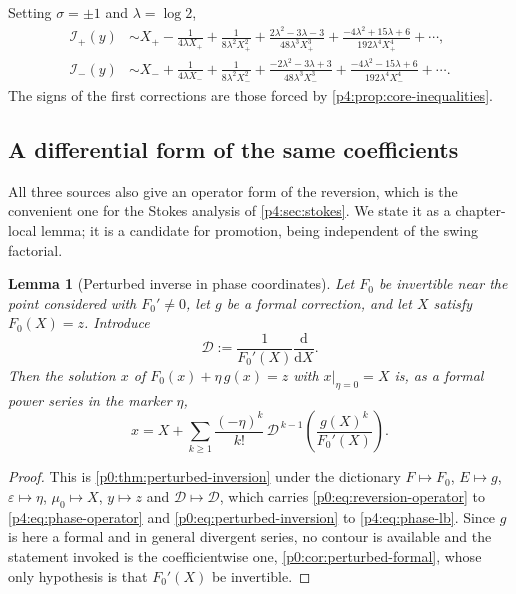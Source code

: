 \documentclass[11pt,a4paper,oneside]{book}
\theoremstyle{plain}
\newtheorem{lemma}[theorem]{Lemma}
\theoremstyle{definition}
\theoremstyle{remark}
\newcommand{\dd}{\mathrm{d}}
\newcommand{\Xcore}{X}
\begin{document}
Setting $\sigma=\pm1$ and $\lambda=\log2$,
\begin{align}
  \mathcal I_+(y)&\sim \Xcore_+
   -\frac1{4\lambda \Xcore_+}+\frac1{8\lambda^{2}\Xcore_+^{2}}
   +\frac{2\lambda^{2}-3\lambda-3}{48\lambda^{3}\Xcore_+^{3}}
   +\frac{-4\lambda^{2}+15\lambda+6}{192\lambda^{4}\Xcore_+^{4}}+\cdots,
  \label{p4:eq:odd-inverse}\\
  \mathcal I_-(y)&\sim \Xcore_-
   +\frac1{4\lambda \Xcore_-}+\frac1{8\lambda^{2}\Xcore_-^{2}}
   +\frac{-2\lambda^{2}-3\lambda+3}{48\lambda^{3}\Xcore_-^{3}}
   +\frac{-4\lambda^{2}-15\lambda+6}{192\lambda^{4}\Xcore_-^{4}}+\cdots.
  \label{p4:eq:even-inverse}
\end{align}
The signs of the first corrections are those forced by
\cref{p4:prop:core-inequalities}.

\subsection{A differential form of the same coefficients}

All three sources also give an operator form of the reversion, which is the
convenient one for the Stokes analysis of \cref{p4:sec:stokes}.  We state it
as a chapter-local lemma; it is a candidate for promotion, being independent
of the swing factorial.

\begin{lemma}[Perturbed inverse in phase coordinates]
\label{p4:lem:phase-lb}
Let $F_0$ be invertible near the point considered with $F_0'\ne0$, let $g$ be
a formal correction, and let $\Xcore$ satisfy $F_0(\Xcore)=z$.  Introduce
\begin{equation}
  \mathscr D:=\frac1{F_0'(\Xcore)}\frac{\dd}{\dd \Xcore}.
  \label{p4:eq:phase-operator}
\end{equation}
Then the solution $x$ of $F_0(x)+\eta\,g(x)=z$ with $x|_{\eta=0}=\Xcore$ is,
as a formal power series in the marker $\eta$,
\begin{equation}
  x=\Xcore+\sum_{k\ge1}\frac{(-\eta)^{k}}{k!}\,
   \mathscr D^{\,k-1}\!\left(\frac{g(\Xcore)^{k}}{F_0'(\Xcore)}\right).
  \label{p4:eq:phase-lb}
\end{equation}
\end{lemma}

\begin{proof}
This is \cref{p0:thm:perturbed-inversion} under the dictionary $F\mapsto F_0$,
$E\mapsto g$, $\varepsilon\mapsto\eta$, $\mu_{0}\mapsto\Xcore$,
$y\mapsto z$ and $\mathcal{D}\mapsto\mathscr D$, which carries
\eqref{p0:eq:reversion-operator} to \cref{p4:eq:phase-operator} and
\eqref{p0:eq:perturbed-inversion} to \cref{p4:eq:phase-lb}.  Since $g$ is here
a formal and in general divergent series, no contour is available and the
statement invoked is the coefficientwise one, \cref{p0:cor:perturbed-formal},
whose only hypothesis is that $F_0'(\Xcore)$ be invertible.
\end{proof}
\end{document}
